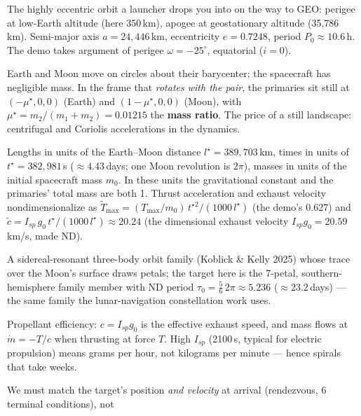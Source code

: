 \documentclass[11pt,letterpaper]{article}
\theoremstyle{noteplain}
\begin{document}
\begin{description}[leftmargin=1.6em,style=nextline]
  \item[GTO (geostationary transfer orbit).] The highly eccentric orbit a
  launcher drops you into on the way to GEO: perigee at low-Earth altitude
  (here 350\,km), apogee at geostationary altitude (35{,}786\,km). Semi-major
  axis $a = 24{,}446$\,km, eccentricity $e = 0.7248$, period
  $P_0 \approx 10.6$\,h. The demo takes argument of perigee
  $\omega = -25^\circ$, equatorial ($i=0$).
  \item[CR3BP (circular restricted three-body problem).] Earth and Moon move
  on circles about their barycenter; the spacecraft has negligible mass. In
  the frame that \emph{rotates with the pair}, the primaries sit still at
  $(-\mu^\star,0,0)$ (Earth) and $(1-\mu^\star,0,0)$ (Moon), with
  $\mu^\star = m_2/(m_1{+}m_2) = 0.01215$ the \textbf{mass ratio}. The price
  of a still landscape: centrifugal and Coriolis accelerations in the
  dynamics.
  \item[Nondimensional (ND) units.] Lengths in units of the Earth--Moon
  distance $l^\star = 389{,}703$\,km, times in units of
  $t^\star = 382{,}981$\,s ($\approx 4.43$\,days; one Moon revolution is
  $2\pi$), masses in units of the initial spacecraft mass $m_0$. In these
  units the gravitational constant and the primaries' total mass are both 1.
  Thrust acceleration and exhaust velocity nondimensionalize as
  $\tilde T_{\max} = (T_{\max}/m_0)\,t^{\star 2}/(1000\,l^\star)$ (the demo's
  0.627) and $\tilde c = I_{sp}\,g_0\,t^\star/(1000\,l^\star) \approx 20.24$
  (the dimensional exhaust velocity $I_{sp} g_0 = 20.59$\,km/s, made ND).
  \item[Tulip orbit.] A sidereal-resonant three-body orbit family (Koblick \&
  Kelly 2025) whose trace over the Moon's surface draws petals; the target
  here is the 7-petal, southern-hemisphere family member with ND period
  $\tau_0 = \tfrac{5}{6}\,2\pi \approx 5.236$ ($\approx 23.2$\,days) --- the
  same family the lunar-navigation constellation work uses.
  \item[Specific impulse $I_{sp}$ / exhaust velocity $c$.] Propellant
  efficiency: $c = I_{sp} g_0$ is the effective exhaust speed, and mass flows
  at $\dot m = -T/c$ when thrusting at force $T$. High $I_{sp}$ (2100\,s,
  typical for electric propulsion) means grams per hour, not kilograms per
  minute --- hence spirals that take weeks.
  \item[Rendezvous vs.\ intercept.] We must match the target's position
  \emph{and velocity} at arrival (rendezvous, 6 terminal conditions), not

\end{description}
\end{document}

